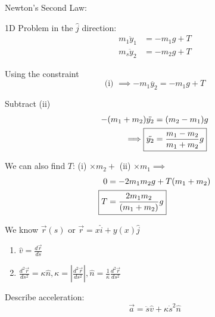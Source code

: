 \documentclass[10pt]{scrartcl}
\begin{document}
\begin{example}[Strings]
Newton's Second Law: 

1D Problem in the $\hat{j}$ direction:
\begin{align*}
  m_1\ddot y_1 &= -m_1g + T \tag{i}\\
  m_s\ddot y_2 &= -m_2g + T \tag{ii}
\end{align*}

Using the constraint 
\[\text{(i) } \implies -m_1 \ddot{y_2} = -m_1g + T\]

Subtract (ii)
\[
\begin{aligned}
  -(m_1 + m_2)\ddot{y_2} &= (m_2 - m_1)g\\
  \implies \Aboxed{\ddot{y_2} &= \frac{m_1 - m_2}{m_1 + m_2}g}
\end{aligned}
\]

We can also find $T$: (i) $\times m_2 + $ (ii) $ \times m_1 \implies$
\[
\begin{aligned}
  0 &= -2m_1m_2g + T(m_1+m_2)\\
  \Aboxed{T &= \frac{2m_1m_2}{(m_1+m_2)}g}
\end{aligned}
\]
\end{example}





We know  $\vec{r}(s)$ or $\vec{r} = x\hat{i} + y(x)\hat{j}$
\begin{enumerate}
  \item $\hat{v} = \frac{d\vec{r}}{ds}$
  \item $\frac{d^2\vec{r}}{ds^2} = \kappa\hat{n}, \kappa = \left|\frac{d^2\vec{r}}{ds^2}\right|, \hat{n} = \frac{1}{\kappa}\frac{d^2\vec{r}}{ds^2}$
\end{enumerate}

Describe acceleration:
\[
  \vec{a} = \ddot{s}\hat{v} + \kappa \dot{s}^2\hat{n}
\]

\begin{center}
\end{center}
\end{document}
